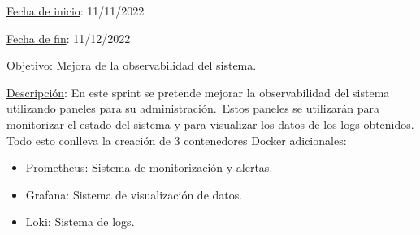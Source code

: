 
\underline{Fecha de inicio}: 11/11/2022

\underline{Fecha de fin}: 11/12/2022

\underline{Objetivo}:
Mejora de la observabilidad del sistema.

\underline{Descripción}:
En este sprint se pretende mejorar la observabilidad del sistema utilizando paneles para su administración.\ Estos
paneles se utilizarán para monitorizar el estado del sistema y para visualizar los datos de los logs obtenidos.
Todo esto conlleva la creación de 3 contenedores Docker adicionales:

\begin{itemize}
	\item Prometheus:
	Sistema de monitorización y alertas.
	\item Grafana:
	Sistema de visualización de datos.
	\item Loki:
	Sistema de logs.
\end{itemize}
